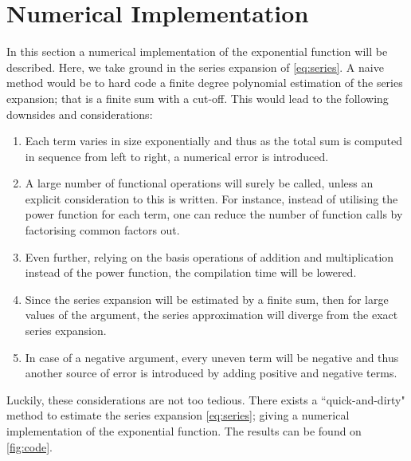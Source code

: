 \documentclass[a4paper, twocolumn, 11pt, oneside]{memoir}
\begin{document}
\section{Numerical Implementation}
In this section a numerical implementation of the exponential function will be
described. Here, we take ground in the series expansion of \cref{eq:series}.
A naive method would be to hard code a finite degree polynomial estimation of
the series expansion; that is a finite sum with a cut-off. 
This would lead to the following downsides and considerations:
\begin{enumerate}
  \item Each term varies in size exponentially and thus as the total sum is
    computed in sequence from left to right, a numerical error is introduced.
  \item A large number of functional operations will surely be called, unless
    an explicit consideration to this is written.
    For instance, instead of utilising the power function for
    each term, one can reduce the number of function calls by factorising
    common factors out.
  \item Even further, relying on the basis operations of addition and
    multiplication instead of the power function, the compilation time will be
    lowered.
  \item Since the series expansion will be estimated by a finite sum, then for
    large values of the argument, the series approximation will diverge from
    the exact series expansion.
  \item In case of a negative argument, every uneven term will be negative
    and thus another source of error is introduced by adding positive and
    negative terms.

\end{enumerate}
Luckily, these considerations are not too tedious. There exists a
``quick-and-dirty" method to estimate the series expansion \cref{eq:series};
giving a numerical implementation of the exponential function. The results can
be found on \cref{fig:code}. 
\end{document}
